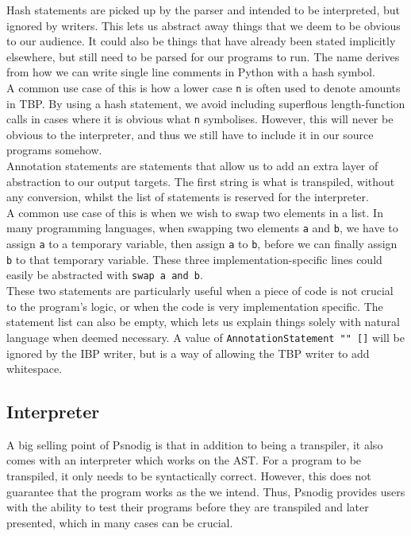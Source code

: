 Hash statements are picked up by the parser and intended to be interpreted, but ignored by writers. This lets us abstract away things that we deem to be obvious to our audience. It could also be things that have already been stated implicitly elsewhere, but still need to be parsed for our programs to run. The name derives from how we can write single line comments in Python with a hash symbol. \hfill \\

A common use case of this is how a lower case \texttt{n} is often used to denote amounts in TBP. By using a hash statement, we avoid including superflous length-function calls in cases where it is obvious what \texttt{n} symbolises. However, this will never be obvious to the interpreter, and thus we still have to include it in our source programs somehow. \hfill \\

Annotation statements are statements that allow us to add an extra layer of abstraction to our output targets. The first string is what is transpiled, without any conversion, whilst the list of statements is reserved for the interpreter. \hfill \\

A common use case of this is when we wish to swap two elements in a list. In many programming languages, when swapping two elements \texttt{a} and \texttt{b}, we have to assign \texttt{a} to a temporary variable, then assign \texttt{a} to \texttt{b}, before we can finally assign \texttt{b} to that temporary variable. These three implementation-specific lines could easily be abstracted with \texttt{swap a and b}. \hfill \\

These two statements are particularly useful when a piece of code is not crucial to the program's logic, or when the code is very implementation specific. The statement list can also be empty, which lets us explain things solely with natural language when deemed necessary. A value of \texttt{AnnotationStatement "" []} will be ignored by the IBP writer, but is a way of allowing the TBP writer to add whitespace.

\subsection{Interpreter}

A big selling point of Psnodig is that in addition to being a transpiler, it also comes with an interpreter which works on the AST. For a program to be transpiled, it only needs to be syntactically correct. However, this does not guarantee that the program works as the we intend. Thus, Psnodig provides users with the ability to test their programs before they are transpiled and later presented, which in many cases can be crucial. \hfill \\

